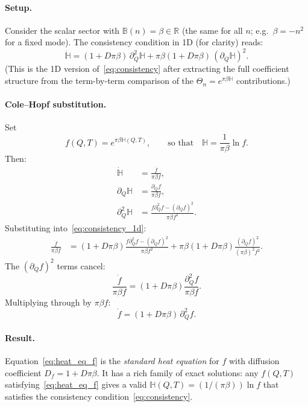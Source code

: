 \documentclass[12pt]{article}
\theoremstyle{definition}
\theoremstyle{remark}
\begin{document}
\paragraph{Setup.}
Consider the scalar sector with $\mathbb{B}(n) = \beta \in \mathbb{R}$ (the
same for all $n$; e.g.\ $\beta = -n^2$ for a fixed mode).
The consistency condition in 1D (for clarity) reads:
\begin{equation}
  \dot{\mathbb{H}}
  = (1 + D\pi\beta)\,\partial_Q^2\mathbb{H}
  + \pi\beta(1 + D\pi\beta)\,(\partial_Q\mathbb{H})^2.
  \label{eq:consistency_1d}
\end{equation}
(This is the 1D version of~\eqref{eq:consistency} after extracting the
full coefficient structure from the term-by-term comparison of the
$\Theta_n = e^{\pi\beta\mathbb{H}}$ contributions.)

\paragraph{Cole--Hopf substitution.}
Set
\begin{equation}
  f(Q, T) = e^{\pi\beta\mathbb{H}(Q,T)},
  \qquad\text{so that}\quad
  \mathbb{H} = \frac{1}{\pi\beta}\ln f.
  \label{eq:cole_hopf_def}
\end{equation}
Then:
\begin{align}
  \dot{\mathbb{H}} &= \frac{\dot f}{\pi\beta f}, \\
  \partial_Q\mathbb{H} &= \frac{\partial_Q f}{\pi\beta f}, \\
  \partial_Q^2\mathbb{H} &= \frac{f\partial_Q^2 f - (\partial_Q f)^2}{\pi\beta f^2}.
\end{align}
Substituting into~\eqref{eq:consistency_1d}:
\begin{align}
  \frac{\dot f}{\pi\beta f}
  &= (1+D\pi\beta)\frac{f\partial_Q^2 f - (\partial_Q f)^2}{\pi\beta f^2}
  + \pi\beta(1+D\pi\beta)\frac{(\partial_Q f)^2}{(\pi\beta)^2 f^2}.
\end{align}
The $(\partial_Q f)^2$ terms cancel:
\begin{equation}
  \frac{\dot f}{\pi\beta f} = (1+D\pi\beta)\frac{\partial_Q^2 f}{\pi\beta f}.
\end{equation}
Multiplying through by $\pi\beta f$:
\begin{equation}
  \boxed{
  \dot f = (1 + D\pi\beta)\,\partial_Q^2 f.
  }
  \label{eq:heat_eq_f}
\end{equation}

\paragraph{Result.}
Equation~\eqref{eq:heat_eq_f} is the \emph{standard heat equation} for $f$
with diffusion coefficient $D_f = 1 + D\pi\beta$.  It has a rich family of
exact solutions: any $f(Q, T)$ satisfying~\eqref{eq:heat_eq_f} gives a
valid $\mathbb{H}(Q, T) = (1/(\pi\beta))\ln f$ that satisfies the
consistency condition~\eqref{eq:consistency}.
\end{document}
